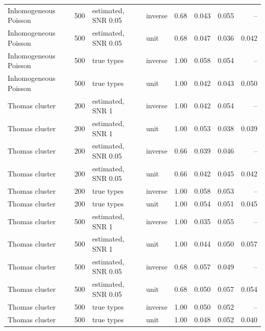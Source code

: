 \begin{tabular}{llllrrrr}
Inhomogeneous Poisson & 500 & estimated, SNR 0.05 & inverse & 0.68 & 0.043 & 0.055 & -- \\
Inhomogeneous Poisson & 500 & estimated, SNR 0.05 & unit & 0.68 & 0.047 & 0.036 & 0.042 \\
Inhomogeneous Poisson & 500 & true types & inverse & 1.00 & 0.058 & 0.054 & -- \\
Inhomogeneous Poisson & 500 & true types & unit & 1.00 & 0.042 & 0.043 & 0.050 \\
Thomas cluster & 200 & estimated, SNR 1 & inverse & 1.00 & 0.042 & 0.054 & -- \\
Thomas cluster & 200 & estimated, SNR 1 & unit & 1.00 & 0.053 & 0.038 & 0.039 \\
Thomas cluster & 200 & estimated, SNR 0.05 & inverse & 0.66 & 0.039 & 0.046 & -- \\
Thomas cluster & 200 & estimated, SNR 0.05 & unit & 0.66 & 0.042 & 0.045 & 0.042 \\
Thomas cluster & 200 & true types & inverse & 1.00 & 0.058 & 0.053 & -- \\
Thomas cluster & 200 & true types & unit & 1.00 & 0.054 & 0.051 & 0.045 \\
Thomas cluster & 500 & estimated, SNR 1 & inverse & 1.00 & 0.035 & 0.055 & -- \\
Thomas cluster & 500 & estimated, SNR 1 & unit & 1.00 & 0.044 & 0.050 & 0.057 \\
Thomas cluster & 500 & estimated, SNR 0.05 & inverse & 0.68 & 0.057 & 0.049 & -- \\
Thomas cluster & 500 & estimated, SNR 0.05 & unit & 0.68 & 0.050 & 0.057 & 0.054 \\
Thomas cluster & 500 & true types & inverse & 1.00 & 0.050 & 0.052 & -- \\
Thomas cluster & 500 & true types & unit & 1.00 & 0.048 & 0.052 & 0.040 \\
\bottomrule
\end{tabular}
